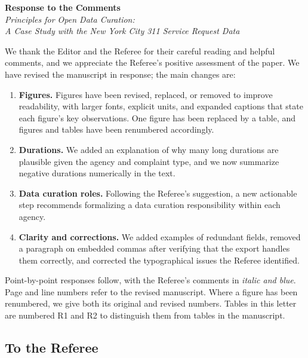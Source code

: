 \documentclass[12pt]{article}
\begin{document}
\begin{center}
{\Large\bfseries Response to the Comments}\\[0.5em]
{\large\itshape Principles for Open Data Curation:\\
A Case Study with the New York City 311 Service Request Data}
\end{center}

\bigskip

We thank the Editor and the Referee for their careful reading and
helpful comments, and we appreciate the Referee's positive assessment
of the paper. We have revised the manuscript in response; the main
changes are:

\begin{enumerate}
\item \textbf{Figures.} Figures have been revised, replaced, or
  removed to improve readability, with larger fonts, explicit units,
  and expanded captions that state each figure's key observations.
  One figure has been replaced by a table, and figures and tables have
  been renumbered accordingly.
\item \textbf{Durations.} We added an explanation of why many long
  durations are plausible given the agency and complaint type, and we
  now summarize negative durations numerically in the text.
\item \textbf{Data curation roles.} Following the Referee's
  suggestion, a new actionable step recommends formalizing a data
  curation responsibility within each agency.
\item \textbf{Clarity and corrections.} We added examples of redundant
  fields, removed a paragraph on embedded commas after verifying that
  the export handles them correctly, and corrected the typographical
  issues the Referee identified.
\end{enumerate}

Point-by-point responses follow, with the Referee's comments in
\emph{\color{darkblue}italic and blue}. Page and line numbers refer to the revised manuscript. Where
a figure has been renumbered, we give both its original and revised
numbers. Tables in this letter are numbered R1 and R2 to distinguish
them from tables in the manuscript.

\subsection*{To the Referee}
\end{document}
